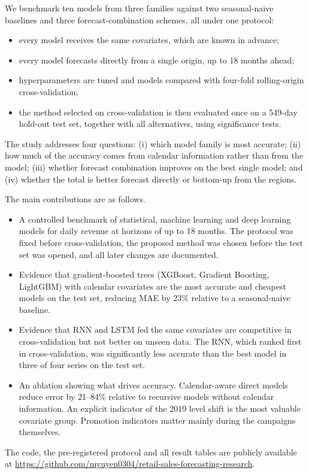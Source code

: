 \documentclass[conference]{IEEEtran}
\begin{document}
We benchmark ten models from three families against two seasonal-naive baselines and three forecast-combination schemes, all under one protocol:
\begin{itemize}
\item every model receives the same covariates, which are known in advance;
\item every model forecasts directly from a single origin, up to 18 months ahead;
\item hyperparameters are tuned and models compared with four-fold rolling-origin cross-validation;
\item the method selected on cross-validation is then evaluated once on a 549-day hold-out test set, together with all alternatives, using significance tests.
\end{itemize}
The study addresses four questions:
(i) which model family is most accurate;
(ii) how much of the accuracy comes from calendar information rather than from the model;
(iii) whether forecast combination improves on the best single model; and
(iv) whether the total is better forecast directly or bottom-up from the regions.

The main contributions are as follows.
\begin{itemize}
\item A controlled benchmark of statistical, machine learning and deep learning models for daily revenue at horizons of up to 18 months. The protocol was fixed before cross-validation, the proposed method was chosen before the test set was opened, and all later changes are documented.
\item Evidence that gradient-boosted trees (XGBoost, Gradient Boosting, LightGBM) with calendar covariates are the most accurate and cheapest models on the test set, reducing MAE by 23\% relative to a seasonal-naive baseline.
\item Evidence that RNN and LSTM fed the same covariates are competitive in cross-validation but not better on unseen data. The RNN, which ranked first in cross-validation, was significantly less accurate than the best model in three of four series on the test set.
\item An ablation showing what drives accuracy. Calendar-aware direct models reduce error by 21--84\% relative to recursive models without calendar information. An explicit indicator of the 2019 level shift is the most valuable covariate group. Promotion indicators matter mainly during the campaigns themselves.
\end{itemize}
The code, the pre-registered protocol and all result tables are publicly available at \url{https://github.com/myuyen0304/retail-sales-forecasting-research}.
\end{document}
